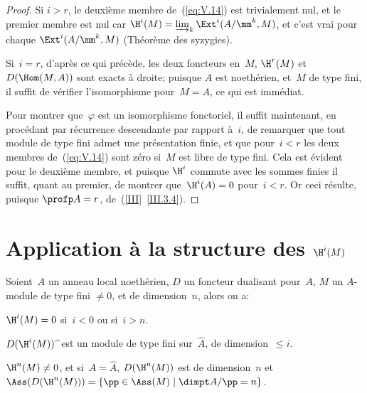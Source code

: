 \begin{proof}
Si $i>r$, le deuxi\`eme membre de~(\ref{eq:V.14}) est trivialement nul, et le premier membre est nul car $\H^{i}(M)=\varinjlim_{k}\Ext^{i}(A/\mm^{k}, M)$, et c'est vrai pour chaque $\Ext^{i}(A/\mm^{k}, M)$ (Th\'eor\`eme des syzygies).

Si~$i=r$, d'apr\`es ce qui pr\'ec\`ede, les deux foncteurs en~$M$, $\H^{r}(M)$ et~$D(\Hom(M, A))$ sont exacts \`a droite; puisque $A$ est noeth\'erien, et~$M$ de type fini, il suffit de v\'erifier l'isomorphisme pour~$M=A$, ce qui est imm\'ediat.

Pour montrer que~$\varphi$ est un isomorphisme fonctoriel, il suffit maintenant, en proc\'edant par r\'ecurrence descendante par rapport \`a~$i$, de remarquer que tout module de type fini admet une pr\'esentation finie, et que pour~$i<r$ les deux membres de~(\ref{eq:V.14}) sont z\'ero si~$M$ est libre de type fini. Cela est \'evident pour le deuxi\`eme membre, et puisque $\H^{i}$ commute avec les sommes finies il suffit, quant au premier, de montrer que~$\H^{i}(A)=0$ pour~$i<r$. Or ceci r\'esulte, puisque $\profp A=r$, de~(\ref{III}~\ref{III.3.4}).
\skipqed
\end{proof}

\section{Application \`a la structure des $\H^i(M)$} \label{V.3}

\setcounter{equation}{14}

\begin{theoreme} \label{V.3.1} Soient~$A$ un anneau local noeth\'erien, $D$ un foncteur dualisant pour~$A$, $M$ un $A$-module de type fini $\neq 0$, et de dimension~$n$, alors on a:
\begin{enumeratei}
\item
$\H^{i}(M)=0$ si~$i<0$ ou si~$i>n$.
\item
$D(\H^{i}(M))\;\widehat{\hbox{}}$ est un module de type fini sur~$\widehat{A}$, de dimension~$\leq i$.
\item
$\H^{n}(M)\neq 0$, et si~$A=\widehat{A}$, $D(\H^{n}(M))$ est de dimension~$n$ et $\Ass(D(\H^{n}(M)))=\{ \pp\in\Ass(M) \mid \dimpt A/\pp=n\}$.
\end{enumeratei}
\end{theoreme}

